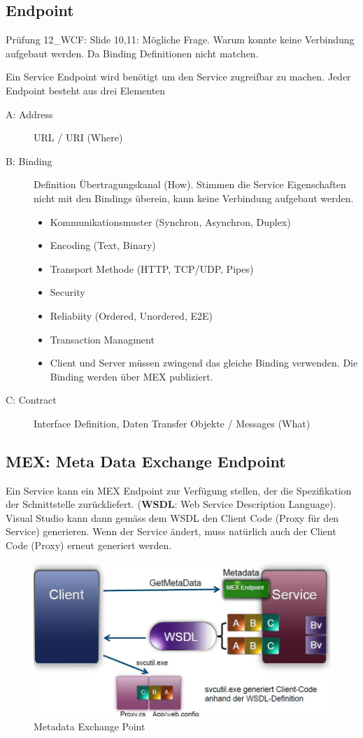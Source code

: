 \documentclass[
a4paper,
oneside,
10pt,
fleqn,
headsepline,
toc=listofnumbered, 
bibliography=totocnumbered]{scrartcl}
\begin{document}
\clearpage

\subsection{Endpoint}
\begin{hint}{Prüfung}{}
12\_WCF: Slide 10,11: Mögliche Frage. Warum konnte keine Verbindung aufgebaut werden. Da Binding Definitionen nicht matchen.
\end{hint}

Ein Service Endpoint wird benötigt um den Service zugreifbar zu machen. Jeder Endpoint besteht aus drei Elementen
\begin{description}
	\item[A: Address] URL / URI (Where)
	\item[B: Binding] Definition Übertragungskanal (How). Stimmen die Service Eigenschaften nicht mit den Bindings überein, kann keine Verbindung aufgebaut werden. 
	\begin{itemize}
		\item Kommunikationsmuster (Synchron, Asynchron, Duplex)
		\item Encoding (Text, Binary)
		\item Transport Methode (HTTP, TCP/UDP, Pipes)
		\item Security
		\item Reliabiity (Ordered, Unordered, E2E)
		\item Transaction Managment
		\item Client und Server müssen zwingend das gleiche Binding verwenden. Die Binding werden über MEX publiziert.
	\end{itemize}
	\item[C: Contract] Interface Definition, Daten Transfer Objekte / Messages (What)
\end{description}

\subsection{MEX: Meta Data Exchange Endpoint}
Ein Service kann ein MEX Endpoint zur Verfügung stellen, der die Spezifikation der Schnittstelle zurückliefert. (\textbf{WSDL}: Web Service Description Language). Visual Studio kann dann gemäss dem WSDL den Client Code (Proxy für den Service) generieren. Wenn der Service ändert, muss natürlich auch der Client Code (Proxy) erneut generiert werden.

\begin{figure}[h!]
\centering
\includegraphics[width=0.7\linewidth]{images/mex}
\caption{Metadata Exchange Point}
\label{fig:mex}
\end{figure}
\end{document}
